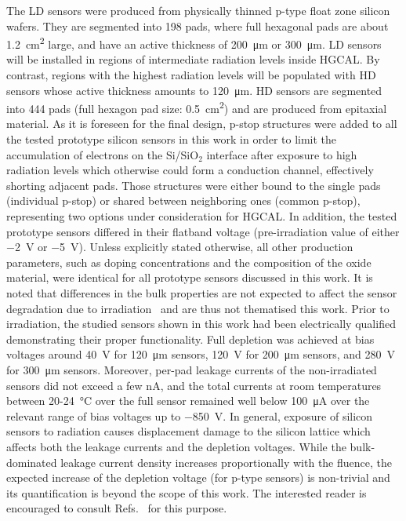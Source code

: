 The LD sensors were produced from physically thinned p-type float zone silicon wafers.
They are segmented into 198 pads, where full hexagonal pads are about \SI{1.2}{\centi\metre\squared} large, and have an active thickness of \SI{200}{\micro\meter} or \SI{300}{\micro\meter}.
LD sensors will be installed in regions of intermediate radiation levels inside HGCAL.
By contrast, regions with the highest radiation levels will be populated with HD sensors whose active thickness amounts to \SI{120}{\micro\meter}.
HD sensors are segmented into 444 pads (full hexagon pad size: \SI{0.5}{\centi\metre\squared}) and are produced from epitaxial material.\newline
As it is foreseen for the final design, p-stop structures were added to all the tested prototype silicon sensors in this work in order to limit the accumulation of electrons on the Si/SiO$_2$ interface after exposure to high radiation levels which otherwise could form a conduction channel, effectively shorting adjacent pads.
Those structures were either bound to the single pads (individual p-stop) or shared between neighboring ones (common p-stop), representing two options under consideration for HGCAL.
In addition, the tested prototype sensors differed in their flatband voltage (pre-irradiation value of either \SI{-2}{\volt} or \SI{-5}{\volt}).
Unless explicitly stated otherwise, all other production parameters, such as doping concentrations and the composition of the oxide material, were identical for all prototype sensors discussed in this work.
It is noted that differences in the bulk properties are not expected to affect the sensor degradation due to irradiation~\cite{MOLL199987} and are thus not thematised this work.
Prior to irradiation, the studied sensors shown in this work had been electrically qualified demonstrating their proper functionality.
Full depletion was achieved at bias voltages around \SI{40}{\volt} for \SI{120}{\micro\metre} sensors, \SI{120}{\volt} for \SI{200}{\micro\metre} sensors, and \SI{280}{\volt} for \SI{300}{\micro\meter} sensors. 
Moreover, per-pad leakage currents of the non-irradiated sensors did not exceed a few nA, and the total currents at room temperatures between 20-\SI{24}{\celsius} over the full sensor remained well below \SI{100}{\micro\ampere} over the relevant range of bias voltages up to \SI{-850}{\volt}. %
In general, exposure of silicon sensors to radiation causes displacement damage to the silicon lattice which affects both the leakage currents and the depletion voltages. 
While the bulk-dominated leakage current density increases proportionally with the fluence, the expected increase of the depletion voltage (for p-type sensors) is non-trivial and its quantification is beyond the scope of this work.
The interested reader is encouraged to consult Refs.~\cite{moll:SiDamages,LINDSTROM200330} for this purpose.